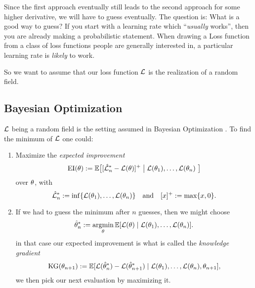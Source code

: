 Since the first approach eventually still leads to the second approach for some
higher derivative, we will have to guess eventually. The question is: What is
a good way to guess? If you start with a learning rate which ``\emph{usually}
works'', then you are already making a probabilistic statement. When drawing a
Loss function from a class of loss functions people are generally interested in,
a particular learning rate is \emph{likely} to work.

So we want to assume that our loss function \(\mathcal{L}\) is the realization of a
random field.

\subsection{Bayesian Optimization}

\(\mathcal{L}\) being a random field is the setting assumed in Bayesian Optimization
\parencite[e.g.][]{frazierBayesianOptimization2018}. To find the minimum
of \(\mathcal{L}\) one could:

\begin{enumerate}
	\item Maximize the \emph{expected improvement} 
	\begin{equation}\label{eq: expected improvement}
		\operatorname{EI}(\theta) := \mathbb{E}\big[
			[\hat{\mathcal{L}}_n^*- \mathcal{L}(\theta)]^+
			\bigm|
			\mathcal{L}(\theta_1),\dots, \mathcal{L}(\theta_n)\
		\big]
	\end{equation}
	over \(\theta\), with
	\begin{equation*}
		\hat{\mathcal{L}}_n^* := \inf\{\mathcal{L}(\theta_1),\dots, \mathcal{L}(\theta_n)\}
		\quad \text{and} \quad
		[x]^+ := \max\{x, 0\}.
	\end{equation*}

	\item If we had to guess the minimum after \(n\) guesses, then we might
	choose
	\begin{equation*}
		\hat{\theta}^*_n
		:= \operatorname*{argmin}_{\theta} \mathbb{E}[\mathcal{L}(\theta)\mid \mathcal{L}(\theta_1), \dots, \mathcal{L}(\theta_n)].
	\end{equation*}
	in that case our expected improvement is what is called the \emph{knowledge gradient}
	\begin{equation*}
		\operatorname{KG}(\theta_{n+1}) := \mathbb{E}[
			\mathcal{L}(\hat{\theta}^*_n) - \mathcal{L}(\hat{\theta}^*_{n+1})
			\mid \mathcal{L}(\theta_1), \dots, \mathcal{L}(\theta_n), \theta_{n+1}
		],
	\end{equation*}
	we then pick our next evaluation by maximizing it.	
\end{enumerate}

